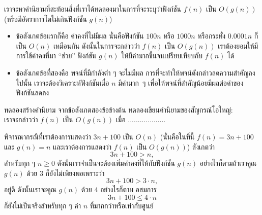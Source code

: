 เรา{\wbr}จะ{\wbr}หา{\wbr}คำ{\wbr}นิยาม{\wbr}ที่{\wbr}สะท้อน{\wbr}สิ่ง{\wbr}ที่{\wbr}เรา{\wbr}ได้{\wbr}ทดลอง{\wbr}มา{\wbr}ใน{\wbr}การ{\wbr}ที่{\wbr}จะ{\wbr}ระบุ{\wbr}ว่า{\wbr}ฟังก์ชัน $f(n)$ เป็น{\wbr}
$O(g(n))$ (หรือ{\wbr}มี{\wbr}อัตรา{\wbr}การ{\wbr}โต{\wbr}ไม่{\wbr}เกิน{\wbr}ฟังก์ชัน $g(n)$)
\begin{itemize}
\item ข้อสังเกต{\wbr}ข้อ{\wbr}แรก{\wbr}ก็{\wbr}คือ ค่าคงที่{\wbr}ไม่{\wbr}มี{\wbr}ผล นั่น{\wbr}คือ{\wbr}ฟังก์ชัน $100n$ หรือ $1000n$ หรือ{\wbr}กระทั่ง{\wbr}
  $0.0001n$ ก็{\wbr}เป็น $O(n)$ เหมือน{\wbr}กัน ดังนั้น{\wbr}ใน{\wbr}การ{\wbr}จะ{\wbr}กล่าว{\wbr}ว่า $f(n)$ เป็น $O(g(n))$
  เรา{\wbr}ต้อง{\wbr}ยอม{\wbr}ให้{\wbr}มี{\wbr}การ{\wbr}ใช้{\wbr}ค่าคงที่{\wbr}มา ``ช่วย'' ฟังก์ชัน $g(n)$
  ให้{\wbr}มี{\wbr}ค่า{\wbr}มาก{\wbr}ขึ้น{\wbr}จน{\wbr}เปรียบเทียบ{\wbr}กับ $f(n)$ ได้{\wbr}
\item ข้อสังเกต{\wbr}ข้อ{\wbr}ที่{\wbr}สอง{\wbr}คือ พจน์{\wbr}ที่{\wbr}มี{\wbr}กำลัง{\wbr}ต่ำ ๆ จะ{\wbr}ไม่{\wbr}มี{\wbr}ผล{\wbr}
  การ{\wbr}ที่{\wbr}จะ{\wbr}ทำ{\wbr}ให้{\wbr}พจน์{\wbr}ดังกล่าว{\wbr}ลด{\wbr}ความ{\wbr}สำคัญ{\wbr}ลง{\wbr}ไป{\wbr}นั้น เรา{\wbr}จะ{\wbr}ต้อง{\wbr}วิเคราะห์{\wbr}ฟังก์ชัน{\wbr}เมื่อ $n$
  มี{\wbr}ค่า{\wbr}มาก~ๆ เพื่อให้{\wbr}พจน์{\wbr}ที่{\wbr}สำคัญ{\wbr}น้อย{\wbr}มี{\wbr}ผล{\wbr}ต่อ{\wbr}ค่า{\wbr}ของ{\wbr}ฟังก์ชัน{\wbr}ลด{\wbr}ลง{\wbr}
\end{itemize}

\begin{quiz}{ทดลอง{\wbr}สร้าง{\wbr}คำ{\wbr}นิยาม}
จาก{\wbr}ข้อสังเกต{\wbr}สอง{\wbr}ข้อ{\wbr}ข้างต้น ทดลอง{\wbr}เขียน{\wbr}คำ{\wbr}นิยาม{\wbr}ของ{\wbr}สัญกรณ์{\wbr}โอ{\wbr}ใหญ่: \\
เรา{\wbr}จะ{\wbr}กล่าว{\wbr}ว่า $f(n)$ เป็น $O(g(n))$ เมื่อ ...................
\end{quiz}

พิจารณา{\wbr}กรณี{\wbr}ที่{\wbr}เรา{\wbr}ต้องการ{\wbr}แสดง{\wbr}ว่า $3n+100$ เป็น $O(n)$ (นั่น{\wbr}คือ{\wbr}ใน{\wbr}ที่นี้ $f(n)=3n+100$
และ $g(n)=n$ และ{\wbr}เรา{\wbr}ต้องการ{\wbr}แสดง{\wbr}ว่า $f(n)$ เป็น $O(g(n))$) สังเกต{\wbr}ว่า{\wbr}
\[
3n + 100 > n,
\]
สำหรับ{\wbr}ทุก ๆ $n\geq 0$ ดังนั้น{\wbr}เรา{\wbr}จำเป็น{\wbr}จะ{\wbr}ต้อง{\wbr}เพิ่ม{\wbr}ค่าคงที่{\wbr}ให้{\wbr}กับ{\wbr}ฟังก์ชัน $g(n)$
อย่างไรก็ตาม{\wbr}ถ้า{\wbr}เรา{\wbr}คูณ $g(n)$ ด้วย 3 ก็{\wbr}ยัง{\wbr}ไม่{\wbr}เพียงพอ{\wbr}เพราะว่า{\wbr}
\[
3n + 100 > 3\cdot n,
\]
อยู่{\wbr}ดี  ดังนั้น{\wbr}เรา{\wbr}จะ{\wbr}คูณ $g(n)$ ด้วย 4  อย่างไรก็ตาม อสมการ{\wbr}
\[
3n + 100 \leq 4\cdot n
\]
ก็{\wbr}ยัง{\wbr}ไม่{\wbr}เป็นจริง{\wbr}สำหรับ{\wbr}ทุก ๆ ค่า $n$ ที่มา{\wbr}กก{\wbr}ว่า{\wbr}หรือ{\wbr}เท่า{\wbr}กับ{\wbr}ศูนย์{\wbr}

